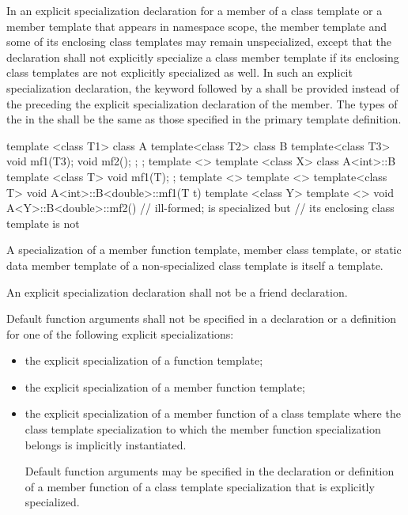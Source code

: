 \pnum
In an explicit specialization declaration for a member of a class template or
a member template that appears in namespace scope,
the member template and some of its enclosing class templates may remain
unspecialized,
except that the declaration shall not explicitly specialize a class member
template if its enclosing class templates are not explicitly specialized
as well.
In such an explicit specialization declaration, the keyword
followed by a
shall be provided instead of the
preceding the explicit specialization declaration of the member.
The types of the
in the
shall be the same as those specified in the primary template definition.
\begin{example}

\begin{codeblock}
template <class T1> class A {
  template<class T2> class B {
    template<class T3> void mf1(T3);
    void mf2();
  };
};
template <> template <class X>
  class A<int>::B {
      template <class T> void mf1(T);
  };
template <> template <> template<class T>
  void A<int>::B<double>::mf1(T t) { }
template <class Y> template <>
  void A<Y>::B<double>::mf2() { }       // ill-formed;  is specialized but
                                        // its enclosing class template  is not
\end{codeblock}
\end{example}

\pnum
A specialization of a member function template, member class template,
or static data member template of
a non-specialized class template is itself a template.

\pnum
An explicit specialization declaration shall not be a friend declaration.

\pnum
Default function arguments shall not be specified in a declaration or
a definition for one of the following explicit specializations:

\begin{itemize}
\item
the explicit specialization of a function template;
\item
the explicit specialization of a member function template;
\item
the explicit specialization of a member function of a class template where
the class template specialization to which the member function specialization
belongs is implicitly instantiated.
\begin{note}
Default function arguments may be specified in the declaration or
definition of a member function of a class template specialization that is
explicitly specialized.
\end{note}
\end{itemize}

